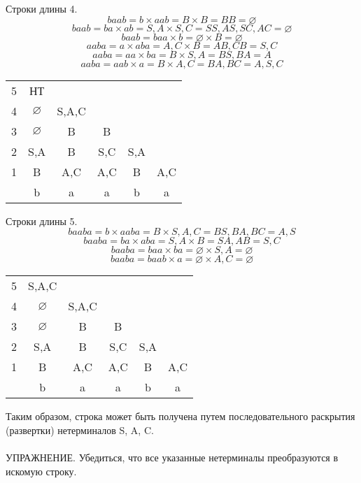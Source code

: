 \documentclass[14pt]{extarticle}
\begin{document}
Строки длины 4.
$$baab = b\times aab = B \times B = BB = \varnothing$$
$$baab = ba\times ab = S,A \times S,C = SS, AS, SC, AC = \varnothing$$
$$baab = baa\times b = \varnothing \times B = \varnothing$$
$$aaba = a\times aba = A,C \times B = AB, CB = S, C$$
$$aaba = aa\times ba = B \times S,A = BS, BA = A$$
$$aaba = aab\times a = B \times A,C = BA, BC = A,S,C$$
\begin{center}
    \begin{tabular}{ c c c c c c}
    5 & НТ & & & & \\ 
    4 & $\varnothing$ & S,A,C & &  \\  
    3 & $\varnothing$ & B & B &  \\  
    2 & S,A & B & S,C & S,A  \\  
    1 & B & A,C & A,C & B & A,C  \\
      & b  &  a &  a & b  &  a 
    \end{tabular}
\end{center}
Строки длины 5. 
$$baaba = b\times aaba = B \times S,A,C = BS, BA, BC = A, S$$
$$baaba = ba\times aba = S,A \times B = SA, AB = S,C$$
$$baaba = baa\times ba = \varnothing \times S,A = \varnothing$$
$$baaba = baab\times a = \varnothing \times A,C = \varnothing$$
\begin{center}
    \begin{tabular}{ c c c c c c}
    5 & S,A,C & & & & \\ 
    4 & $\varnothing$ & S,A,C & &  \\  
    3 & $\varnothing$ & B & B &  \\  
    2 & S,A & B & S,C & S,A  \\  
    1 & B & A,C & A,C & B & A,C  \\
      & b  &  a &  a & b  &  a 
    \end{tabular}
\end{center}
Таким образом, строка может быть получена путем последовательного раскрытия
(развертки) нетерминалов S, A, C.\\\\
УПРАЖНЕНИЕ. 
Убедиться, что все указанные нетерминалы преобразуются в искомую строку. 
\end{document}
